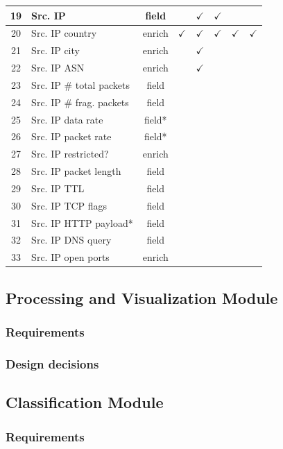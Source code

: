 \documentclass{llncs}
\begin{document}
\begin{table}[h!]
\begin{tabular}{|c| l | c |c|c|c|c|c|}
19&Src.  IP &field& ~ &$\checkmark$ & $\checkmark$& ~ & ~    \\ \hline 
20&Src. IP country	&enrich&$\checkmark$ & $\checkmark$ & $\checkmark$& $\checkmark$ & $\checkmark$   \\
\hline    
21&Src.  IP city &enrich& ~ & $\checkmark$	& ~ & ~ & ~   \\  \hline
22&Src. IP ASN &enrich& ~ & $\checkmark$	& ~ & ~ & ~ \\ \hline 
23&Src. IP \# total packets&field&&&&&\\ \hline
24&Src. IP \# frag. packets  &field&&&&&\\ \hline 
25&Src. IP data rate & field*&&&&&\\ \hline
26&Src. IP packet rate & field* &&&&&\\ \hline
27&Src. IP restricted?  &enrich&&&&& \\ \hline 
28&Src. IP packet length &field &&&&&\\ \hline 
29&Src. IP TTL  &field &&&&&\\ \hline
\rowcolor{yellow}30&Src. IP TCP flags &field &&&&&\\ \hline 
\rowcolor{yellow}31&Src. IP HTTP payload* & field&&&&&\\ \hline
\rowcolor{yellow}32&Src. IP DNS query  & field&&&&&\\ \hline 
\rowcolor{yellow}33&Src. IP open ports &enrich&&&&&\\ \hline 

\end{tabular} 
\end{table}


\subsection{Processing and Visualization Module}
\subsubsection{Requirements}
\subsubsection{Design decisions}

\subsection{Classification Module}
\subsubsection{Requirements}
\end{document}
